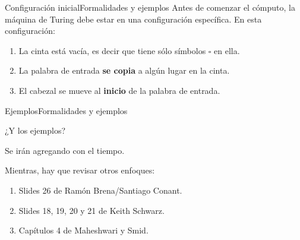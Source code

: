 \documentclass[spanish]{beamer}
\begin{document}
\begin{frame}{Configuración inicial}{Formalidades y ejemplos}
    Antes de comenzar el cómputo, la máquina de Turing debe estar en una configuración específica. En esta configuración:

    \bigskip

    \begin{enumerate}
        \item La cinta está vacía, es decir que tiene sólo símbolos $\square$ en ella. \pause
        \item La palabra de entrada \textbf{se copia} a algún lugar en la cinta. \pause
        \item El cabezal se mueve al \textbf{inicio} de la palabra de entrada.
    \end{enumerate}
    
\end{frame}

\begin{frame}{Ejemplos}{Formalidades y ejemplos}
    \begin{center}
        {\Huge ¿Y los ejemplos?}
    \end{center}
    \begin{center}
        {\Large Se irán agregando con el tiempo.}

        \bigskip

        Mientras, hay que revisar otros enfoques:

        \bigskip
        
        \begin{enumerate}
            \item Slides 26 de Ramón Brena/Santiago Conant.
            \item Slides 18, 19, 20 y 21 de Keith Schwarz.
            \item Capítulos 4 de Maheshwari y Smid.
        \end{enumerate}
    \end{center}

\end{frame}



% 
% 
\end{document}
